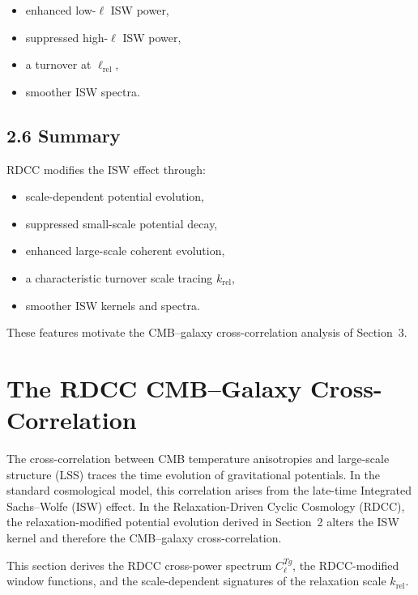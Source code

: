 \documentclass[11pt,a4paper]{article}
\begin{document}
\begin{itemize}
    \item enhanced low-$\ell$ ISW power,
    \item suppressed high-$\ell$ ISW power,
    \item a turnover at $\ell_{\mathrm{rel}}$,
    \item smoother ISW spectra.
\end{itemize}

\subsection*{2.6 Summary}

RDCC modifies the ISW effect through:

\begin{itemize}
    \item scale-dependent potential evolution,
    \item suppressed small-scale potential decay,
    \item enhanced large-scale coherent evolution,
    \item a characteristic turnover scale tracing $k_{\mathrm{rel}}$,
    \item smoother ISW kernels and spectra.
\end{itemize}

These features motivate the CMB–galaxy cross-correlation analysis of Section~3.

\section{The RDCC CMB–Galaxy Cross-Correlation}

The cross-correlation between CMB temperature anisotropies and large-scale structure (LSS) 
traces the time evolution of gravitational potentials. In the standard cosmological model, 
this correlation arises from the late-time Integrated Sachs–Wolfe (ISW) effect. In the 
Relaxation-Driven Cyclic Cosmology (RDCC), the relaxation-modified potential evolution 
derived in Section~2 alters the ISW kernel and therefore the CMB–galaxy cross-correlation.

This section derives the RDCC cross-power spectrum $C_{\ell}^{Tg}$, the RDCC-modified 
window functions, and the scale-dependent signatures of the relaxation scale 
$k_{\mathrm{rel}}$.
\end{document}
